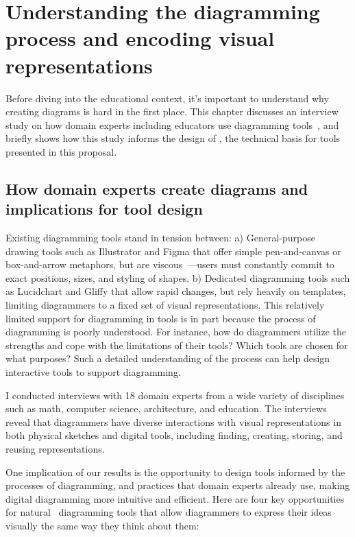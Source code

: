 
\chapter{Understanding the diagramming process and encoding visual representations}
\label{chp:interviews}

Before diving into the educational context, it's important to understand why creating diagrams is hard in the first place. This chapter discusses an interview study on how domain experts including educators use diagramming tools~\cite{naturalDiagramming}, and briefly shows how this study informs the design of \Penrose, the technical basis for tools presented in this proposal. 

\section{How domain experts create diagrams and implications for tool design}
\label{sec:naturalDiagramming}

Existing diagramming tools stand in tension between: a) General-purpose drawing tools such as Illustrator and Figma that offer simple pen-and-canvas or box-and-arrow metaphors, but are viscous~\cite{cognitiveDimensions}---users must constantly commit to exact positions, sizes, and styling of shapes. b) Dedicated diagramming tools such as Lucidchart and Gliffy that allow rapid changes, but rely heavily on templates, limiting diagrammers to a fixed set of visual representations. This relatively limited support for diagramming in tools is in part because the process of diagramming is poorly understood. For instance, how do diagrammers utilize the strengths and cope with the limitations of their tools? Which tools are chosen for what purposes?  Such a detailed understanding of the process can help design interactive tools to support diagramming.

I conducted interviews with 18 domain experts from a wide variety of disciplines such as math, computer science, architecture, and education. The interviews reveal that diagrammers have diverse interactions with visual representations in both physical sketches and digital tools, including finding, creating, storing, and reusing representations. 

One implication of our results is the opportunity to design tools informed by the processes of diagramming, and practices that domain experts already use, making digital diagramming more intuitive and efficient. Here are four key opportunities for natural~\cite{naturalProgramming} diagramming tools that allow diagrammers to express their ideas visually the same way they think about them:

